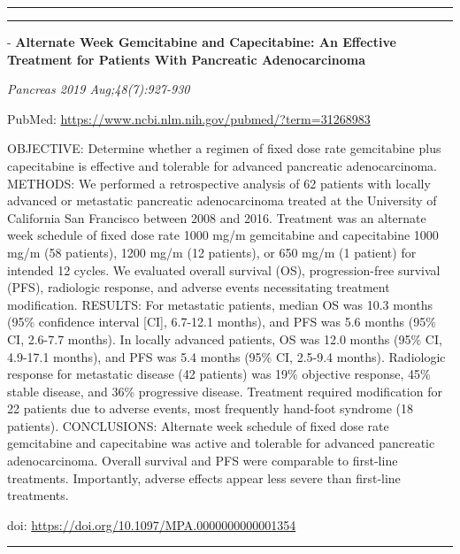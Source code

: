 \documentclass[]{article}
\begin{document}
\begin{center}\rule{0.5\linewidth}{\linethickness}\end{center}

\begin{center}\rule{0.5\linewidth}{\linethickness}\end{center}

 - \textbf{Alternate Week Gemcitabine and Capecitabine: An Effective
Treatment for Patients With Pancreatic Adenocarcinoma}

\emph{Pancreas 2019 Aug;48(7):927-930}

PubMed: \url{https://www.ncbi.nlm.nih.gov/pubmed/?term=31268983}

OBJECTIVE: Determine whether a regimen of fixed dose rate gemcitabine
plus capecitabine is effective and tolerable for advanced pancreatic
adenocarcinoma. METHODS: We performed a retrospective analysis of 62
patients with locally advanced or metastatic pancreatic adenocarcinoma
treated at the University of California San Francisco between 2008 and
2016. Treatment was an alternate week schedule of fixed dose rate 1000
mg/m gemcitabine and capecitabine 1000 mg/m (58 patients), 1200 mg/m (12
patients), or 650 mg/m (1 patient) for intended 12 cycles. We evaluated
overall survival (OS), progression-free survival (PFS), radiologic
response, and adverse events necessitating treatment modification.
RESULTS: For metastatic patients, median OS was 10.3 months (95\%
confidence interval {[}CI{]}, 6.7-12.1 months), and PFS was 5.6 months
(95\% CI, 2.6-7.7 months). In locally advanced patients, OS was 12.0
months (95\% CI, 4.9-17.1 months), and PFS was 5.4 months (95\% CI,
2.5-9.4 months). Radiologic response for metastatic disease (42
patients) was 19\% objective response, 45\% stable disease, and 36\%
progressive disease. Treatment required modification for 22 patients due
to adverse events, most frequently hand-foot syndrome (18 patients).
CONCLUSIONS: Alternate week schedule of fixed dose rate gemcitabine and
capecitabine was active and tolerable for advanced pancreatic
adenocarcinoma. Overall survival and PFS were comparable to first-line
treatments. Importantly, adverse effects appear less severe than
first-line treatments.

doi: \url{https://doi.org/10.1097/MPA.0000000000001354}

{}

{}

\begin{center}\rule{0.5\linewidth}{\linethickness}\end{center}
\end{document}
